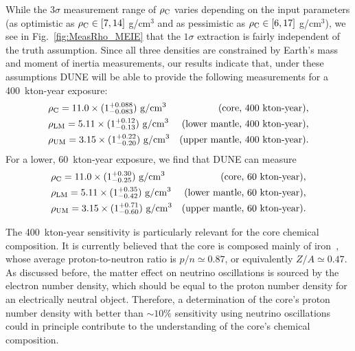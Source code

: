 While the $3\sigma$ measurement range of $\rho_{\rm C}$ varies depending on the input parameters (as optimistic as $\rho_{\rm C} \in [7, 14]$ g/cm$^3$ and as pessimistic as $\rho_{\rm C} \in [6, 17]$ g/cm$^3$), we see in Fig.~\ref{fig:MeasRho_MEIE} that the $1\sigma$ extraction is fairly independent of the truth assumption.
Since all three densities are constrained by Earth's mass and moment of inertia measurements, our results indicate that, under these assumptions DUNE will be able to provide the following measurements for a 400~kton-year exposure:
\begin{subequations}
\begin{align}
  &\rho_{\rm C} = 11.0 \times(1^{+0.088}_{-0.083})~{\rm g}/{\rm cm}^3         &\text{(core, 400~kton-year)},&\\
  &\rho_{\rm LM} = 5.11\times(1^{+0.12}_{-0.13})~{\rm g}/{\rm cm}^3        &\text{(lower mantle, 400~kton-year)},&\\
  &\rho_{\rm UM} = 3.15 \times(1^{+0.22}_{-0.20})~{\rm g}/{\rm cm}^3      &\text{(upper mantle, 400~kton-year)}.&
\end{align}
\end{subequations}
For a lower, 60~kton-year exposure, we find that DUNE can measure
\begin{subequations}
\begin{align}
  &\rho_{\rm C} = 11.0 \times(1^{+0.30}_{-0.25})~{\rm g}/{\rm cm}^3         &\text{(core, 60~kton-year)},&\\
  &\rho_{\rm LM} = 5.11\times(1^{+0.35}_{-0.42})~{\rm g}/{\rm cm}^3        &\text{(lower mantle, 60~kton-year)},&\\
  &\rho_{\rm UM} = 3.15 \times(1^{+0.71}_{-0.60})~{\rm g}/{\rm cm}^3      &\text{(upper mantle, 60~kton-year)}.&
\end{align}
\end{subequations}

The 400~kton-year sensitivity is particularly relevant for the core chemical composition.
It is currently believed that the core is composed mainly of iron~\cite{Dziewonski:1981xy}, whose average proton-to-neutron ratio is $p/n\simeq 0.87$, or equivalently $Z/A\simeq0.47$. 
As discussed before, the matter effect on neutrino oscillations is sourced by the electron number density, which should be equal to the proton number density for an electrically neutral object.
Therefore, a determination of the core's proton number density with better than $\sim10\%$ sensitivity using neutrino oscillations could in principle contribute to the understanding of the core's chemical composition.

